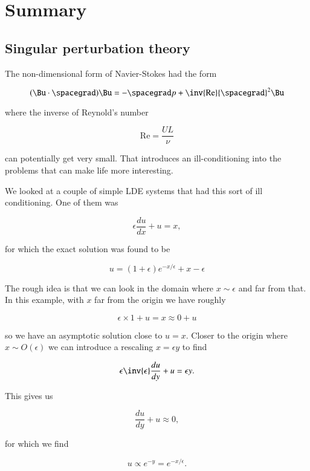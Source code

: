 \section{Summary}
\subsection{Singular perturbation theory}

The non-dimensional form of Navier-Stokes had the form

\begin{equation}\label{eqn:continuumFluidsReview:2670}
(\Bu \cdot \spacegrad) \Bu = -\spacegrad p + \inv{\text{Re}} {\spacegrad}^2 \Bu
\end{equation}

where the inverse of Reynold's number

\begin{equation}\label{eqn:continuumFluidsReview:2610}
\text{Re} = \frac{U L}{\nu}
\end{equation}

can potentially get very small.  That introduces an ill-conditioning into the problems that can make life more interesting.

We looked at a couple of simple LDE systems that had this sort of ill conditioning.  One of them was

\begin{equation}\label{eqn:continuumFluidsReview:2630}
\epsilon \frac{du}{dx} + u = x,
\end{equation}

for which the exact solution was found to be

\begin{equation}\label{eqn:continuumFluidsReview:2650}
u = (1 + \epsilon) e^{-x/\epsilon} + x - \epsilon
\end{equation}

The rough idea is that we can look in the domain where $x \sim \epsilon$ and far from that.  In this example, with $x$ far from the origin we have roughly

\begin{equation}\label{eqn:continuumFluidsReview:2690}
\epsilon \times 1 + u = x \approx 0 + u
\end{equation}

so we have an asymptotic solution close to $u = x$.  Closer to the origin where $x \sim O(\epsilon)$ we can introduce a rescaling $x = \epsilon y$ to find

\begin{equation}\label{eqn:continuumFluidsReview:2710}
\epsilon \inv{\epsilon} \frac{du}{dy} + u = \epsilon y.
\end{equation}

This gives us

\begin{equation}\label{eqn:continuumFluidsReview:2730}
\frac{du}{dy} + u \approx 0,
\end{equation}

for which we find 

\begin{equation}\label{eqn:continuumFluidsReview:2750}
u \propto e^{-y} = e^{-x/\epsilon}.
\end{equation}

